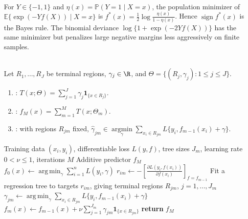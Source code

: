 \begin{remark} \label{rem:sl-exponential-loss-population-target} \\
For $Y\in\{-1,1\}$ and $\eta(x)=\mathbb{P}(Y=1\mid X=x)$, the population minimizer of $\mathbb{E}\{\exp(-Yf(X))\mid X=x\}$ is $f^*(x)=\frac12\log\frac{\eta(x)}{1-\eta(x)}$.  Hence $\operatorname{sign}f^*(x)$ is the Bayes rule.  The binomial deviance $\log\{1+\exp(-2Yf(X))\}$ has the same minimizer but penalizes large negative margins less aggressively on finite samples.
\end{remark}

\begin{definition} \label{def:sl-additive-tree-expansion} \\
Let $R_1,\ldots,R_J$ be terminal regions, $\gamma_j\in\R$, and $\Theta=\{(R_j,\gamma_j):1\le j\le J\}$.
\begin{enumerate}[label=(\roman*)]
\setlength{\itemsep}{0pt}
\item {}: $T(x;\Theta)=\sum\limits_{j=1}^J\gamma_j\mathbf{1}_{\{x\in R_j\}}$.
\item {}: $f_M(x)=\sum\limits_{m=1}^M T(x;\Theta_m)$.
\item {}: with regions $R_{jm}$ fixed, $\widehat{\gamma}_{jm}\in\operatorname*{argmin}\limits_{\gamma}\sum\limits_{x_i\in R_{jm}}L\{y_i,f_{m-1}(x_i)+\gamma\}$.
\end{enumerate}
\end{definition}

\begin{breakablealgorithm}
\caption{Gradient Tree Boosting}
\label{alg:sl-gradient-tree-boosting}
\begin{algorithmic}
\Require Training data $(x_i,y_i)$, differentiable loss $L(y,f)$, tree sizes $J_m$, learning rate $0<\nu\leq1$, iterations $M$
\Ensure Additive predictor $f_M$
\State $\displaystyle f_0(x)\gets\operatorname*{arg\,min}_{\gamma}\sum_{i=1}^n L(y_i,\gamma)$
\State $\displaystyle r_{im}\gets-\left[\frac{\partial L(y_i,f(x_i))}{\partial f(x_i)}\right]_{f=f_{m-1}}$
\EndFor
\State Fit a regression tree to targets $r_{im}$, giving terminal regions $R_{jm}$, $j=1,\ldots,J_m$
\State $\displaystyle \gamma_{jm}\gets
\operatorname*{arg\,min}_{\gamma}
\sum_{x_i\in R_{jm}}L\{y_i,f_{m-1}(x_i)+\gamma\}$
\EndFor
\State $\displaystyle f_m(x)\gets f_{m-1}(x)+
\nu\sum_{j=1}^{J_m}\gamma_{jm}\mathbf{1}_{\{x\in R_{jm}\}}$
\EndFor
\State \textbf{return} $f_M$
\end{algorithmic}
\end{breakablealgorithm}

